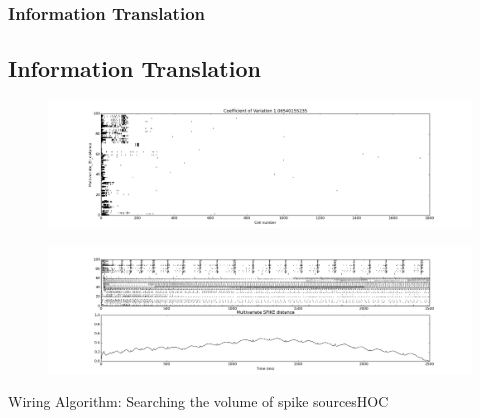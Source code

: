 \documentclass{beamer}
\begin{document}
\begin{frame}
\frametitle{Information Translation}
\subsection{Information Translation}


\begin{figure}
\includegraphics[scale=0.2]{kreuz_multivariatem_isi050025001_00100_0101.png}
\end{figure}

\begin{figure}
\includegraphics[scale=0.2]{kreuz_multivariatem_spike_distance050025001_00100_0101.png}
\end{figure}


\end{frame}



\begin{frame}{Wiring Algorithm: Searching the volume of spike sources}{HOC}
\lstI
\end{frame}
\end{document}
